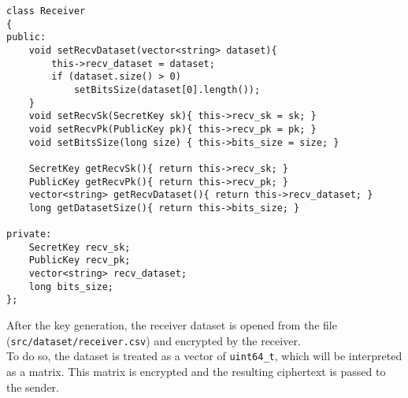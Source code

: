 \documentclass[10pt]{extarticle}
\begin{document}
\newpage
\begin{lstlisting}
class Receiver
{
public:
	void setRecvDataset(vector<string> dataset){ 
		this->recv_dataset = dataset;
		if (dataset.size() > 0)
			setBitsSize(dataset[0].length());
	}
	void setRecvSk(SecretKey sk){ this->recv_sk = sk; } 
	void setRecvPk(PublicKey pk){ this->recv_pk = pk; }
	void setBitsSize(long size) { this->bits_size = size; }
	
	SecretKey getRecvSk(){ return this->recv_sk; } 
	PublicKey getRecvPk(){ return this->recv_pk; } 
	vector<string> getRecvDataset(){ return this->recv_dataset; }
	long getDatasetSize(){ return this->bits_size; }

private:
	SecretKey recv_sk;
	PublicKey recv_pk;
	vector<string> recv_dataset;
	long bits_size;
};
\end{lstlisting}
After the key generation, the receiver dataset is opened from the file (\texttt{src/dataset/receiver.csv}) and encrypted by the receiver.\\To do so, the dataset is treated as a vector of \texttt{uint64\_t}, which will be interpreted as a matrix. This matrix is encrypted and the resulting ciphertext is passed to the sender.
\end{document}
